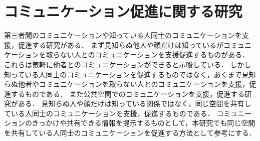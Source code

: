 \section{コミュニケーション促進に関する研究}\label{2.4}
第三者間のコミュニケーションや知っている人同士のコミュニケーションを支援，促進する研究がある．
まず見知らぬ他人や顔だけは知っているがコミュニケーションを取らない人とのコミュニケーションを支援促進するものがある\cite{hati}\cite{tikachat}\cite{compresence}\cite{siruetto}．
これらは気軽に他者とのコミュニケーションができると示唆している．
しかし知っている人同士のコミュニケーションを促進するものではなく，あくまで見知らぬ他者やコミュニケーションを取らない人とのコミュニケーションを支援，促進するものである．
また公共空間でのコミュニケーションを支援，促進する研究がある\cite{komyusoku}\cite{travelingcafe}\cite{meetingpot}\cite{photochat}．
見知らぬ人や顔だけは知っている関係ではなく，同じ空間を共有している人同士のコミュニケーションを支援，促進するものである．
コミュニーションのきっかけや共有できる情報を提示するものとして，本研究でも同じ空間を共有している人同士のコミュニケーションを促進する方法として参考にする．




